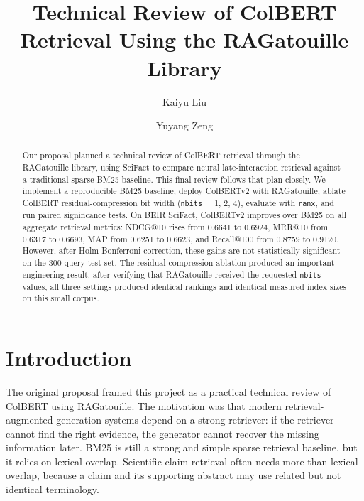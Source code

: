 \documentclass[sigconf,nonacm]{acmart}
\begin{document}
\title{Technical Review of ColBERT Retrieval Using the RAGatouille Library}

\author{Kaiyu Liu}

\author{Yuyang Zeng}

\renewcommand{\shortauthors}{Liu and Zeng}

\begin{abstract}
Our proposal planned a technical review of ColBERT retrieval through the
RAGatouille library, using SciFact to compare neural late-interaction retrieval
against a traditional sparse BM25 baseline. This final review follows that plan
closely. We implement a reproducible BM25 baseline, deploy ColBERTv2 with
RAGatouille, ablate ColBERT residual-compression bit width
(\texttt{nbits} = 1, 2, 4), evaluate with \texttt{ranx}, and run paired
significance tests. On BEIR SciFact, ColBERTv2 improves over BM25 on all
aggregate retrieval metrics: NDCG@10 rises from 0.6641 to 0.6924, MRR@10 from
0.6317 to 0.6693, MAP from 0.6251 to 0.6623, and Recall@100 from 0.8759 to
0.9120. However, after Holm-Bonferroni correction, these gains are not
statistically significant on the 300-query test set. The residual-compression
ablation produced an important engineering result: after verifying that
RAGatouille received the requested \texttt{nbits} values, all three settings
produced identical rankings and identical measured index sizes on this small
corpus.
\end{abstract}


\maketitle

\section{Introduction}

The original proposal framed this project as a practical technical review of
ColBERT using RAGatouille. The motivation was that modern retrieval-augmented
generation systems depend on a strong retriever: if the retriever cannot find
the right evidence, the generator cannot recover the missing information later.
BM25 is still a strong and simple sparse retrieval baseline, but it relies on
lexical overlap. Scientific claim retrieval often needs more than lexical
overlap, because a claim and its supporting abstract may use related but not
identical terminology.
\end{document}

